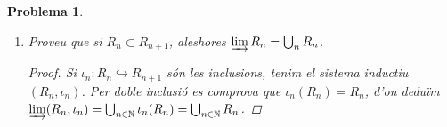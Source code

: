 \documentclass[compress]{article}
\newtheorem{problema}{Problema}
\theoremstyle{definition}
\begin{document}
\begin{problema}
\begin{enumerate}
\begin{proof}
            \begin{center}
            \end{center}
            d'on deduïm que $\psi\circ\phi=id_{A}$ i $\phi\circ\psi=id_{\varinjlim(R_{n},f_{n})}$.\newline
            Ara, si $\iota_{n}:M_{n}(R)\rightarrow M_{\infty}(R)$ és la inclusió i $\phi:M_{\infty}(R)\rightarrow S$ ve definida per $\phi(a)=\varphi_{n}(a)$ si $a\in M_{n}(R)$, es comprova que $\phi$ esta ben definida (es fa igual que amb $\psi$) i que el diagrama
            \begin{center}
            \end{center}
            commuta. Per tant, $M_{\infty}(R)\cong\varinjlim(M_{n}(R),f_{n})$.
        \end{proof}
        \item Proveu que si $R_{n}\subset R_{n+1}$, aleshores $\varinjlim R_{n}=\bigcup_{n}R_{n}$.
        \begin{proof}
            Si $\iota_{n}:R_{n}\hookrightarrow R_{n+1}$ són les inclusions, tenim el sistema inductiu $(R_{n},\iota_{n})$. Per doble inclusió es comprova que $\iota_{n}(R_{n})=R_{n}$, d'on deduïm $\varinjlim(R_{n},\iota_{n})=\bigcup_{n\in\mathbb{N}}\iota_{n}(R_{n})=\bigcup_{n\in\mathbb{N}}R_{n}$.
        \end{proof}
     \end{enumerate}
\end{problema}
\end{document}
